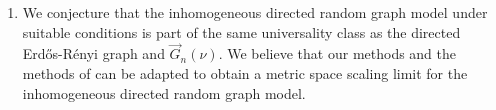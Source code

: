 \begin{enumerate}
    \item We conjecture that the inhomogeneous directed random graph model under suitable conditions is part of the same universality class as the directed Erd\H{o}s-Rényi graph \cite{goldschmidtScalingLimitCritical2019} and $\vec{G}_n(\nu)$. We believe that our methods and the methods of \cite{goldschmidtScalingLimitCritical2019} can be adapted to obtain a metric space scaling limit for the inhomogeneous directed random graph model. 

\end{enumerate}

